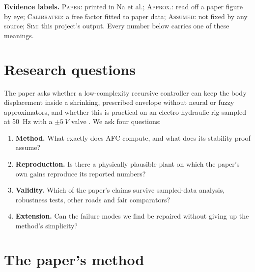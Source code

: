 \documentclass[10pt,a4paper]{article}
\newcommand{\evid}[1]{\textsc{#1}}
\begin{document}
\noindent\textbf{Evidence labels.} \evid{Paper}: printed in Na et al.; \evid{Approx.}: read off a paper figure by eye; \evid{Calibrated}: a free factor fitted to paper data; \evid{Assumed}: not fixed by any source; \evid{Sim}: this project's output. Every number below carries one of these meanings.

\section{Research questions}
The paper asks whether a low-complexity recursive controller can keep the body displacement inside a shrinking, prescribed envelope without neural or fuzzy approximators, and whether this is practical on an electro-hydraulic rig sampled at \SI{50}{Hz} with a \(\pm\SI{5}{V}\) valve \cite{na2022}. We ask four questions:
\begin{enumerate}\itemsep0pt
\item \textbf{Method.} What exactly does AFC compute, and what does its stability proof assume?
\item \textbf{Reproduction.} Is there a physically plausible plant on which the paper's own gains reproduce its reported numbers?
\item \textbf{Validity.} Which of the paper's claims survive sampled-data analysis, robustness tests, other roads and fair comparators?
\item \textbf{Extension.} Can the failure modes we find be repaired without giving up the method's simplicity?
\end{enumerate}

\section{The paper's method}
\end{document}
